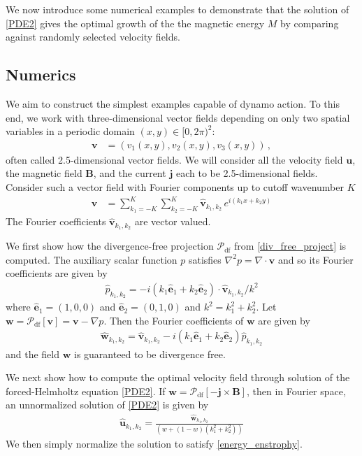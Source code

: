 \documentclass[onecolumn,showpacs,preprintnumbers,amsmath,amssymb]{revtex4-2}
\newcommand{\bvec}[1]{{\mathbf{#1}}}
\newcommand{\grad}{\nabla}
\newcommand{\uu}{\bvec{u}}
\newcommand{\vv}{\bvec{v}}
\newcommand{\Bvec}{\bvec{B}}
\newcommand{\jvec}{\bvec{j}}
\newcommand{\weight}{w}
\newcommand{\ex}{\hat{\bvec{e}}_1}
\newcommand{\ey}{\hat{\bvec{e}}_2}
\newcommand{\proj}{ \mathcal{P}_{\text{df}} }
\newcommand{\eikx}{e^{ i \left( k_1 x + k_2 y \right) }}
\begin{document}
We now introduce some numerical examples to demonstrate that the solution of \cref{PDE2} gives the optimal growth of the the magnetic energy $M$ by comparing against randomly selected velocity fields.

\subsection{Numerics}

We aim to construct the simplest examples capable of dynamo action.
To this end, we work with three-dimensional vector fields depending on only two spatial variables in a periodic domain $(x,y) \in [0, 2\pi)^2$:
\begin{align}
\vv &= (v_1(x,y), v_2(x,y), v_3(x,y)) \, ,
\end{align}
often called 2.5-dimensional vector fields. We will consider all the velocity field $\uu$, the magnetic field $\Bvec$, and the current $\jvec$ each to be 2.5-dimensional fields.
Consider such a vector field with Fourier components up to cutoff wavenumber $K$
\begin{align}
\label{vec_Fourier}
\vv &= \sum_{k_1 = -K}^{K} \sum_{k_2 = -K}^{K} \hat{\vv}_{k_1, k_2} \, \eikx
\end{align}
The Fourier coefficients $\hat{\vv}_{k_1, k_2}$ are vector valued.

We first show how the divergence-free projection $\proj$ from \cref{div_free_project} is computed. The auxiliary scalar function $p$ satisfies $\grad^2 p = \grad \cdot \vv$ and so its Fourier coefficients are given by
\begin{align}
\label{}
\hat{p}_{k_1, k_2} = -i  \left( k_1 \ex + k_2 \ey \right) \cdot \hat{\vv}_{k_1,k_2} / k^2
\end{align}
where $\ex = (1,0,0)$ and $\ey = (0,1,0)$ and $k^2 = k_1^2 + k_2^2$. Let $\bvec{w} = \proj[ \vv ] = \vv - \grad p$. Then the Fourier coefficients of $\bvec{w}$ are given by
\begin{align}
\label{}
\hat{\bvec{w}}_{k_1, k_2} = \hat{\vv}_{k_1,k_2} - i \left( k_1 \ex + k_2 \ey \right) \hat{p}_{k_1,k_2}
\end{align}
and the field $\bvec{w}$ is guaranteed to be divergence free.

We next show how to compute the optimal velocity field through solution of the forced-Helmholtz equation \cref{PDE2}. If $\bvec{w} = \proj \left[ - \jvec \times \Bvec \right]$, then in Fourier space, an unnormalized solution of \cref{PDE2} is given by
\begin{align}
\label{PDE2}
\hat{\uu}_{k_1,k_2} = \frac{\hat{\bvec{w}}_{k_1,k_2} }{ \left( \weight + (1-\weight) (k_1^2 + k_2^2) \right)  }
\end{align}
We then simply normalize the solution to satisfy \cref{energy_enstrophy}.
\end{document}

